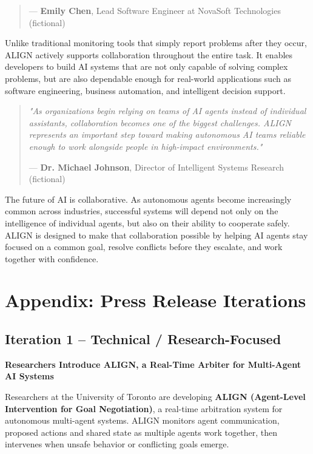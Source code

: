 \documentclass[11pt]{article}
\begin{document}
{\begin{quote}
\hfill--- \textbf{Emily Chen}, Lead Software Engineer at NovaSoft Technologies (fictional)
\end{quote}

Unlike traditional monitoring tools that simply report problems after they occur, ALIGN actively supports collaboration throughout the entire task. It enables developers to build AI systems that are not only capable of solving complex problems, but are also dependable enough for real-world applications such as software engineering, business automation, and intelligent decision support.

\begin{quote}
\emph{"As organizations begin relying on teams of AI agents instead of individual assistants, collaboration becomes one of the biggest challenges. ALIGN represents an important step toward making autonomous AI teams reliable enough to work alongside people in high-impact environments."}

\hfill--- \textbf{Dr. Michael Johnson}, Director of Intelligent Systems Research (fictional)
\end{quote}

The future of AI is collaborative. As autonomous agents become increasingly common across industries, successful systems will depend not only on the intelligence of individual agents, but also on their ability to cooperate safely. ALIGN is designed to make that collaboration possible by helping AI agents stay focused on a common goal, resolve conflicts before they escalate, and work together with confidence.

\newpage
\appendix
\section{Appendix: Press Release Iterations}

\subsection{Iteration 1 -- Technical / Research-Focused}

\textbf{Researchers Introduce ALIGN, a Real-Time Arbiter for Multi-Agent AI Systems}

Researchers at the University of Toronto are developing \textbf{ALIGN (Agent-Level Intervention for Goal Negotiation)}, a real-time arbitration system for autonomous multi-agent systems. ALIGN monitors agent communication, proposed actions and shared state as multiple agents work together, then intervenes when unsafe behavior or conflicting goals emerge.

}
\end{document}
